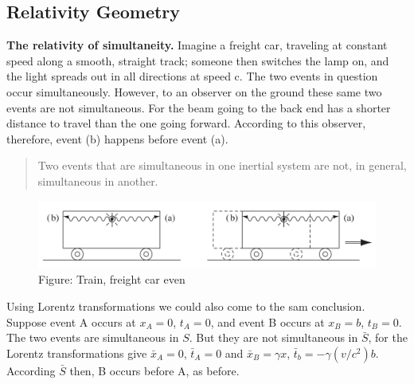 \documentclass[../main.tex]{subfiles}
\begin{document}
\subsection*{Relativity Geometry}
\textbf{The relativity of simultaneity.} Imagine a freight car, traveling at constant speed along a smooth, straight track; someone then switches the lamp on, and the light spreads out in all directions at speed c. The two events in question occur simultaneously. However, to an observer on the ground these same two events are not simultaneous. For the beam going to the back end has a shorter distance to travel than the one going forward. According to this observer, therefore, event (b) happens before event (a). 
\begin{quote}
    Two events that are simultaneous in one inertial system are not, in general, simultaneous in another.
\end{quote}
\begin{figure}[b]
    \centering
    \includegraphics[width=\textwidth]{../Rss/Relativity/Simultaneity}
    \caption*{Figure: Train, freight car even}
\end{figure}
Using Lorentz transformations we could also come to the sam conclusion. Suppose event A occurs at $x_A = 0$, $t_A = 0$, and event B occurs at $x_B = b$, $t_B = 0$. The two events are simultaneous in $S$. But they are not simultaneous in $\bar{S}$, for the Lorentz transformations give $\bar{x}_A = 0$, $\bar{t}_A = 0$ and $\bar{x}_B = \gamma x$, $\bar{t}_b = -\gamma(v/c^2)b$. According $\bar{S}$ then, B occurs before A, as before.
\end{document}
